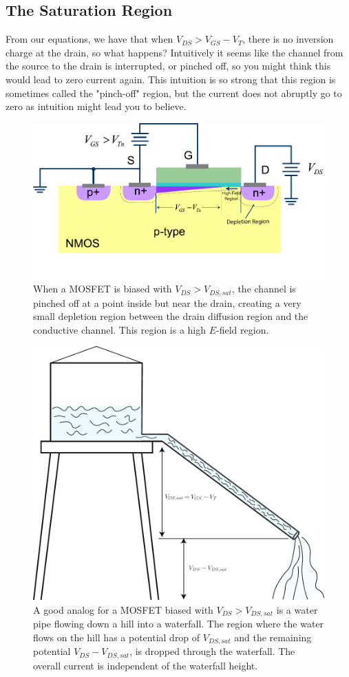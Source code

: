 \subsection{The Saturation Region}
From our equations, we have that when $V_{DS} > V_{GS} - V_T$, there is no inversion charge at the drain, so what happens? Intuitively it seems like the channel from the source to the drain is interrupted, or pinched off, so you might think this would lead to zero current again.  This intuition is so strong that this region is sometimes called the "pinch-off" region, but the current does not abruptly go to zero as intuition might lead you to believe.  
\begin{figure}[tb]
\centering
\includegraphics[width=.75\columnwidth]{mos_current_sat}
\caption{When a MOSFET is biased with $V_{DS} > V_{DS,sat}$, the channel is pinched off at a point inside but near the drain, creating a very small depletion region between the drain diffusion region and the conductive channel.  This region is a high $E$-field region.}
\label{fig:mos_current_sat}
\end{figure}
\begin{figure}[tb]
\centering
\includegraphics[width=.75\columnwidth]{waterfall}
\caption{A good analog for a MOSFET biased with $V_{DS} > V_{DS,sat}$ is a water pipe flowing down a hill into a waterfall.  The region where the water flows on the hill has a potential drop of $V_{DS,sat}$ and the remaining potential $V_{DS} - V_{DS,sat}$, is dropped through the waterfall.  The overall current is independent of the waterfall height.}
\label{fig:waterfall}
\end{figure}
